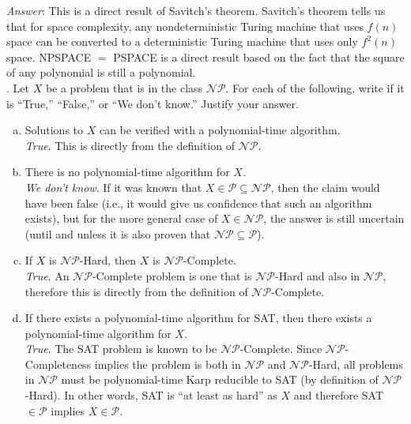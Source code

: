 \documentclass{scrartcl}
\begin{document}
    \noindent
    \textit{Answer}: This is a direct result of Savitch's theorem. Savitch's theorem tells us that
    for space complexity, any nondeterministic Turing machine that uses $f(n)$ space can be
    converted to a deterministic Turing machine that uses only $f^2(n)$ space. \textsf{NPSPACE $=$
    PSPACE} is a direct result based on the fact that the square of any polynomial is still a
    polynomial.\\

    \newpage
    . Let $X$ be a problem that is in the class $\mathcal{NP}$. For each of the following, write if
    it is ``True,'' ``False,'' or ``We don't know.'' Justify your answer.
    \begin{enumerate}[(a)]
        \item Solutions to $X$ can be verified with a polynomial-time algorithm.\\

            \textit{True}. This is directly from the definition of $\mathcal{NP}$.\\
        \item There is no polynomial-time algorithm for $X$.\\

            \textit{We don't know}. If it was known that $X \in \mathcal{P} \subseteq \mathcal{NP}$,
            then the claim would have been false (i.e., it would give us confidence that such an
            algorithm exists), but for the more general case of $X \in \mathcal{NP}$, the answer is
            still uncertain (until and unless it is also proven that $\mathcal{NP} \subseteq
            \mathcal{P}$).\\
        \item If $X$ is $\mathcal{NP}$-Hard, then $X$ is $\mathcal{NP}$-Complete.\\

            \textit{True}. An $\mathcal{NP}$-Complete problem is one that is $\mathcal{NP}$-Hard and
            also in $\mathcal{NP}$, therefore this is directly from the definition of
            $\mathcal{NP}$-Complete.\\
        \item If there exists a polynomial-time algorithm for \textsf{SAT}, then there exists a
            polynomial-time algorithm for $X$.\\

            \textit{True}. The \textsf{SAT} problem is known to be $\mathcal{NP}$-Complete. Since
            $\mathcal{NP}$-Completeness implies the problem is both in $\mathcal{NP}$ and
            $\mathcal{NP}$-Hard, all problems in $\mathcal{NP}$ must be polynomial-time Karp
            reducible to \textsf{SAT} (by definition of $\mathcal{NP}$-Hard). In other words,
            \textsf{SAT} is ``at least as hard'' as $X$ and therefore \textsf{SAT} $\in \mathcal{P}$
            implies $X \in \mathcal{P}$.
    \end{enumerate}
\end{document}
